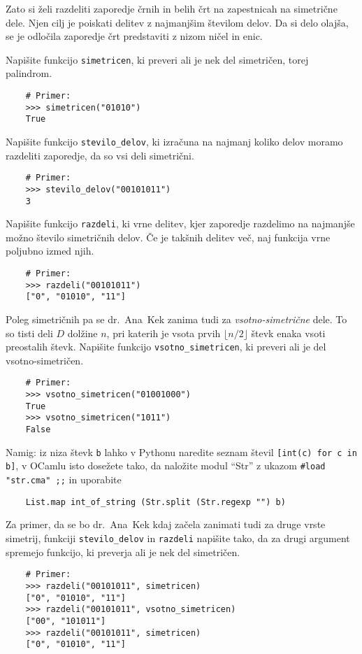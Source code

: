 \documentclass[arhiv]{../izpit}
\begin{document}
Zato si želi razdeliti zaporedje črnih in belih črt na zapestnicah na simetrične dele. Njen cilj je poiskati delitev z najmanjšim številom delov.
Da si delo olajša, se je odločila zaporedje črt predstaviti z nizom ničel in enic.

\podnaloga
Napišite funkcijo \verb|simetricen|, ki preveri ali je nek del simetričen, torej palindrom.
\begin{verbatim}
    # Primer:
    >>> simetricen("01010")
    True
\end{verbatim}

\podnaloga
Napišite funkcijo \verb|stevilo_delov|, ki izračuna na najmanj koliko delov moramo razdeliti zaporedje, da so vsi deli simetrični.

\begin{verbatim}
    # Primer:
    >>> stevilo_delov("00101011")
    3
\end{verbatim}

\podnaloga
Napišite funkcijo \verb|razdeli|, ki vrne delitev, kjer zaporedje razdelimo na najmanjše možno število simetričnih delov. Če je takšnih delitev več, naj funkcija vrne poljubno izmed njih.

\begin{verbatim}
    # Primer:
    >>> razdeli("00101011")
    ["0", "01010", "11"]
\end{verbatim}

\podnaloga
Poleg simetričnih pa se dr.~Ana~Kek zanima tudi za \emph{vsotno-simetrične} dele. To so tisti deli $D$ dolžine $n$, pri katerih je vsota prvih $\lfloor n / 2 \rfloor$ števk enaka vsoti preostalih števk. Napišite funkcijo \verb|vsotno_simetricen|, ki preveri ali je del vsotno-simetričen.

\begin{verbatim}
    # Primer:
    >>> vsotno_simetricen("01001000")
    True
    >>> vsotno_simetricen("1011")
    False
\end{verbatim}

Namig: iz niza števk \verb|b| lahko v Pythonu naredite seznam števil \verb|[int(c) for c in b]|, v OCamlu isto dosežete tako, da naložite modul ``Str'' z ukazom \verb|#load "str.cma" ;;| in uporabite
\begin{verbatim}
    List.map int_of_string (Str.split (Str.regexp "") b)
\end{verbatim}

\podnaloga
Za primer, da se bo dr.~Ana~Kek kdaj začela zanimati tudi za druge vrste simetrij, funkciji \verb|stevilo_delov| in \verb|razdeli| napišite tako, da za drugi argument spremejo funkcijo, ki preverja ali je nek del simetričen.

\begin{verbatim}
    # Primer:
    >>> razdeli("00101011", simetricen)
    ["0", "01010", "11"]
    >>> razdeli("00101011", vsotno_simetricen)
    ["00", "101011"]
    >>> razdeli("00101011", simetricen)
    ["0", "01010", "11"]
\end{verbatim}
\end{document}
